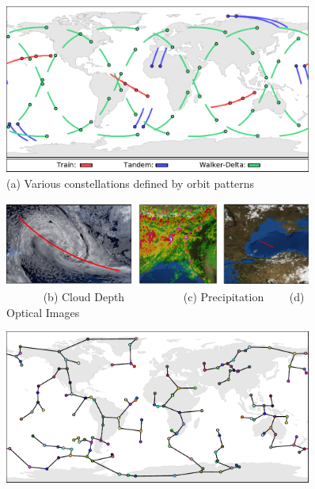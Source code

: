 \documentclass[conference]{IEEEtran}
\begin{document}
\begin{figure}[t!]
  \begin{minipage}[b]{\linewidth}
    \begin{center}
      \includegraphics[width=0.9\textwidth]{images/constellations.pdf} \\
      {\footnotesize(a) Various constellations defined by orbit patterns}
    \end{center}
    \medskip
  \end{minipage}
  \begin{minipage}[b]{\linewidth}
    \begin{center}
      \includegraphics[width=0.9\textwidth]{images/remote_sensing.pdf} \\
      {\footnotesize{
          \color{white}~~~~~~\color{black}
          (b) Cloud Depth~~~~~~~~~~
          (c) Precipitation~~~~
          (d) Optical Images}}
    \end{center}
    \medskip
  \end{minipage}
  \begin{minipage}[b]{\linewidth}
    \begin{center}
      \includegraphics[width=0.9\textwidth]{images/prim.pdf} \\

\end{center}
\end{minipage}
\end{figure}
\end{document}
